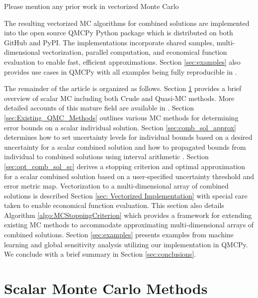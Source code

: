 \documentclass{article}[12pt]
\newcommand{\JRComment}[1]{{\color{violet}#1}}
\begin{document}
\JRComment{Please mention any prior work in vectorized Monte Carlo}

The resulting vectorized MC algorithms for combined solutions are implemented into the open source QMCPy Python package \cite{QMCPy} which is distributed on both GitHub and PyPI. The implementations incorporate shared samples, multi-dimensional vectorization, parallel computation, and economical function evaluation to enable fast, efficient approximations. Section \ref{sec:examples} also provides use cases in QMCPy with all examples being fully reproducible in .

The remainder of the article is organized as follows. Section \ref{sec:MCM} provides a brief overview of scalar MC including both Crude and Quasi-MC methods. More detailed accounts of this mature field are available in \cite{niederreiter1992random,mcbook}. Section \ref{sec:Existing_QMC_Methods} outlines various MC methods for determining error bounds on a scalar individual solution. Section \ref{sec:comb_sol_approx} determines how to set uncertainty levels for individual bounds based on a desired uncertainty for a scalar combined solution and how to propagated bounds from individual to combined solutions using interval arithmetic \cite{interval_analysis}. Section \ref{sec:opt_comb_sol_sc} derives a stopping criterion and optimal approximation for a scalar combined solution based on a user-specified uncertainty threshold and error metric map. Vectorization to a multi-dimensional array of combined solutions is described Section \ref{sec: Vectorized Implementation} with special care taken to enable economical function evaluation. This section also details Algorithm \ref{algo:MCStoppingCriterion} which provides a framework for extending existing MC methods to accommodate approximating multi-dimensional arrays of combined solutions. Section \ref{sec:examples} presents examples from machine learning and global sensitivity analysis utilizing our implementation in QMCPy. We conclude with a brief summary in Section \ref{sec:conclusions}.   

\section{Scalar Monte Carlo Methods} \label{sec:MCM}
\end{document}
